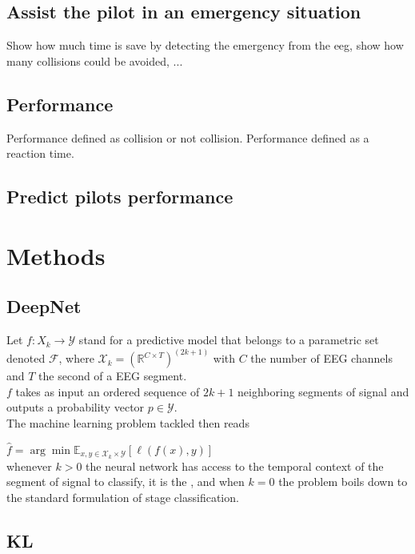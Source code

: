 \documentclass{article}
\begin{document}
\subsection{Assist the pilot in an emergency situation}
Show how much time is save by detecting the emergency from the eeg, show how many collisions could be avoided, ... 

\subsection{Performance}
Performance defined as collision or not collision.
Performance defined as a reaction time.

\subsection{Predict pilots performance}



\section{Methods}

\subsection{DeepNet}
Let
$f: X_k \rightarrow{\mathcal{Y}} $
stand for a predictive model that belongs to a parametric set denoted $\mathcal{F}$, where  $\mathcal{X}_k = \left( \mathbb{R}^{C \times T} \right)^{(2k+1)} $ with $C$ the number of EEG channels and $T$ the second of a EEG segment.\\

$f$ takes as input an ordered sequence of $2k+1$ neighboring segments of signal and outputs a probability vector $p\in \mathcal{Y}$.\\

The machine learning problem tackled then reads

$\hat{f}  = \arg \min \mathbb{E}_{x,y\in \mathcal{X}_k \times \mathcal{Y}} \left[ \ell (f(x),y) \right]$\\


whenever $k>0$ the neural network has access to the temporal context of the segment of signal to classify, it is the , and when $k=0$ the problem boils down to the standard formulation of stage classification. 

\subsection{KL}



\end{document}
